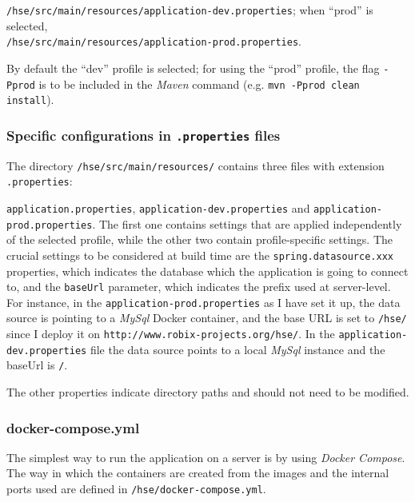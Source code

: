 \documentclass[a4paper]{usiinfbachelorproject}
\begin{document}
\begin{appendices}
\texttt{/hse/src/main/resources/application-dev.properties};
        when ``prod'' is selected, \\ \texttt{/hse/src/main/resources/application-prod.properties}. 

        By default the ``dev'' profile is selected;
        for using the ``prod'' profile, the flag \texttt{-Pprod} is to be included in the \emph{Maven} command 
        (e.g. \texttt{mvn -Pprod clean install}).

        \subsubsection{Specific configurations in \texttt{.properties} files}

        The directory \texttt{/hse/src/main/resources/} contains three files with extension \texttt{.properties}:

        \texttt{application.properties}, \texttt{application-dev.properties} and \texttt{application-prod.properties}.
        The first one contains settings that are applied independently of the selected profile, while the other
        two contain profile-specific settings. The crucial settings to be considered at build time are the 
        \texttt{spring.datasource.xxx} properties, which indicates the database which the application is going to connect to, and 
        the \texttt{baseUrl} parameter, which indicates the prefix used at server-level.
        For instance, in the \texttt{application-prod.properties} as I have set it up, the data source is pointing to a \emph{MySql} Docker container,
        and the base URL is set to \texttt{/hse/} since I deploy it on \texttt{http://www.robix-projects.org/hse/}. 
        In the \texttt{application-dev.properties} file the data source points to a local \emph{MySql} instance and the baseUrl is \texttt{/}.

        The other properties indicate directory paths and should not need to be modified.

        \subsubsection{docker-compose.yml}

        The simplest way to run the application on a server is by using \emph{Docker Compose}. The way in which the containers are created from the images
        and the internal ports used are defined in 
        \texttt{/hse/docker-compose.yml}.


\end{appendices}
\end{document}
